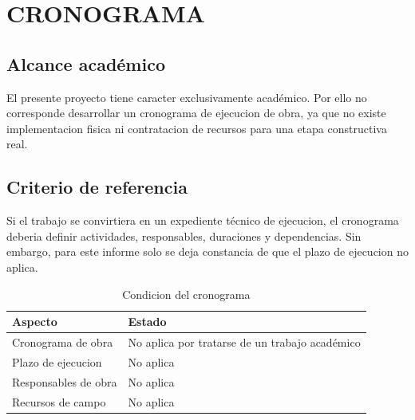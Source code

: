 \chapter{CRONOGRAMA}

\section{Alcance académico}

El presente proyecto tiene caracter exclusivamente académico. Por ello no corresponde desarrollar un cronograma de ejecucion de obra, ya que no existe implementacion fisica ni contratacion de recursos para una etapa constructiva real.

\section{Criterio de referencia}

Si el trabajo se convirtiera en un expediente técnico de ejecucion, el cronograma deberia definir actividades, responsables, duraciones y dependencias. Sin embargo, para este informe solo se deja constancia de que el plazo de ejecucion no aplica.

\begin{table}[H]
\centering
\caption{Condicion del cronograma}
\label{tab:cronograma-no-aplica}
\begin{tabularx}{\textwidth}{p{4cm}X}
\toprule
\textbf{Aspecto} & \textbf{Estado} \\
\midrule
Cronograma de obra & No aplica por tratarse de un trabajo académico \\
Plazo de ejecucion & No aplica \\
Responsables de obra & No aplica \\
Recursos de campo & No aplica \\
\bottomrule
\end{tabularx}
\end{table}
